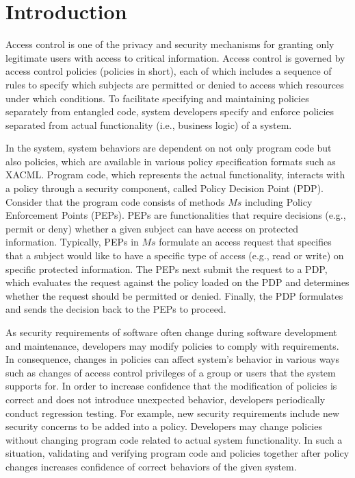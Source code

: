 \section{Introduction} \label{sec:introduction}
 
Access control is one of the privacy and security mechanisms for granting only legitimate users with access to critical information. 
Access control is governed by access control policies (policies in short), each of which includes a sequence of rules to specify 
which subjects are permitted or denied to access which resources under which conditions. To facilitate specifying and maintaining policies separately from entangled code, 
system developers specify and enforce policies separated from actual functionality (i.e., business logic) of a system.

In the system, system behaviors are dependent on not only program code but also policies, which
are available in various policy specification formats such as XACML.
Program code, which represents the actual functionality,
interacts with a policy through a security component, called Policy Decision Point (PDP).
Consider that the program code consists of methods $Ms$ including Policy Enforcement Points (PEPs).
PEPs are functionalities that require decisions (e.g., permit or deny) whether a given subject can have access on protected information.
Typically, PEPs in $Ms$ formulate an access request that specifies that a subject would like to have a specific type of access (e.g., read or write) on specific protected information. 
The PEPs next submit the request to a PDP, which evaluates the request against the policy loaded on the PDP and determines whether the request should be permitted or denied. Finally, 
the PDP formulates and sends the
decision back to the PEPs to proceed.



As security requirements of software often change during software development and maintenance,
developers may modify policies to comply with requirements.
In consequence, changes in policies can affect system's behavior in various ways such as
changes of access control privileges of a group or users that the system supports for.
In order to increase confidence that the modification of policies is correct and
does not introduce unexpected behavior, developers periodically conduct regression testing.
For example, new security requirements include new security concerns to be added into a policy.
Developers may change policies without changing program code related to actual system functionality.
In such a situation, validating and verifying program code and policies together after policy changes
increases confidence of correct behaviors of the given system.


